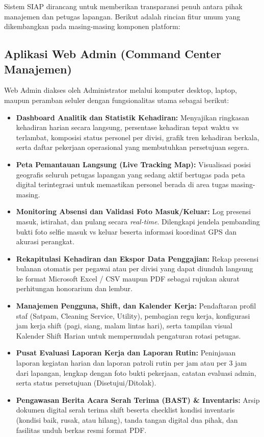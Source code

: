 \documentclass[11pt,a4paper]{article}
\begin{document}
Sistem SIAP dirancang untuk memberikan transparansi penuh antara pihak manajemen dan petugas lapangan. Berikut adalah rincian fitur umum yang dikembangkan pada masing-masing komponen platform:

\subsection{Aplikasi Web Admin (Command Center Manajemen)}
Web Admin diakses oleh Administrator melalui komputer desktop, laptop, maupun peramban seluler dengan fungsionalitas utama sebagai berikut:
\begin{itemize}
    \item \textbf{Dashboard Analitik dan Statistik Kehadiran:} Menyajikan ringkasan kehadiran harian secara langsung, persentase kehadiran tepat waktu vs terlambat, komposisi status personel per divisi, grafik tren kehadiran berkala, serta daftar pekerjaan operasional yang membutuhkan persetujuan segera.
    \item \textbf{Peta Pemantauan Langsung (Live Tracking Map):} Visualisasi posisi geografis seluruh petugas lapangan yang sedang aktif bertugas pada peta digital terintegrasi untuk memastikan personel berada di area tugas masing-masing.
    \item \textbf{Monitoring Absensi dan Validasi Foto Masuk/Keluar:} Log presensi masuk, istirahat, dan pulang secara \textit{real-time}. Dilengkapi jendela pembanding bukti foto selfie masuk vs keluar beserta informasi koordinat GPS dan akurasi perangkat.
    \item \textbf{Rekapitulasi Kehadiran dan Ekspor Data Penggajian:} Rekap presensi bulanan otomatis per pegawai atau per divisi yang dapat diunduh langsung ke format Microsoft Excel / CSV maupun PDF sebagai rujukan akurat perhitungan honorarium dan lembur.
    \item \textbf{Manajemen Pengguna, Shift, dan Kalender Kerja:} Pendaftaran profil staf (Satpam, Cleaning Service, Utility), pembagian regu kerja, konfigurasi jam kerja shift (pagi, siang, malam lintas hari), serta tampilan visual Kalender Shift Harian untuk mempermudah pengaturan rotasi petugas.
    \item \textbf{Pusat Evaluasi Laporan Kerja dan Laporan Rutin:} Peninjauan laporan kegiatan harian dan laporan patroli rutin per jam atau per 3 jam dari lapangan, lengkap dengan foto bukti pekerjaan, catatan evaluasi admin, serta status persetujuan (Disetujui/Ditolak).
    \item \textbf{Pengawasan Berita Acara Serah Terima (BAST) \& Inventaris:} Arsip dokumen digital serah terima shift beserta checklist kondisi inventaris (kondisi baik, rusak, atau hilang), tanda tangan digital dua pihak, dan fasilitas unduh berkas resmi format PDF.

\end{itemize}
\end{document}
